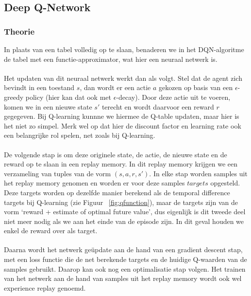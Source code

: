 \documentclass[11pt]{article}
\begin{document}
\subsection{Deep Q-Network}
\subsubsection{Theorie}
In plaats van een tabel volledig op te slaan, benaderen we in het DQN-algoritme de tabel met een functie-approximator, wat hier een neuraal netwerk is.\\\\
Het updaten van dit neuraal netwerk werkt dan als volgt. Stel dat de agent zich bevindt in een toestand $s$, dan wordt er een actie $a$ gekozen op basis van een $\epsilon$-greedy policy (hier kan dat ook met $\epsilon$-decay). Door deze actie uit te voeren, komen we in een nieuwe state $s'$ terecht en wordt daarvoor een reward $r$ gegegeven. Bij Q-learning kunnne we hiermee de Q-table updaten, maar hier is het niet zo simpel. Merk wel op dat hier de discount factor en learning rate ook een belangrijke rol spelen, net zoals bij Q-learning.\\\\
De volgende stap is om deze originele state, de actie, de nieuwe state en de reward op te slaan in een replay memory. In dit replay memory krijgen we een verzameling van tuples van de vorm $(s,a,r,s')$. In elke stap worden samples uit het replay memory genomen en worden er voor deze samples $targets$ opgesteld. Deze targets worden op dezelfde manier berekend als de temporal difference targets bij Q-learning (zie Figuur ~\ref{fig:qfunction}), maar de targets zijn van de vorm `reward + estimate of optimal future value', dus eigenlijk is dit tweede deel niet meer nodig als we aan het einde van de episode zijn. In dit geval houden we enkel de reward over als target. \\\\
Daarna wordt het netwerk geüpdate aan de hand van een gradient descent stap, met een loss functie die de net berekende targets en de huidige Q-waarden van de samples gebruikt. Daarop kan ook nog een optimalisatie stap volgen. Het trainen van het netwerk aan de hand van samples uit het replay memory wordt ook wel experience replay genoemd.
\end{document}
